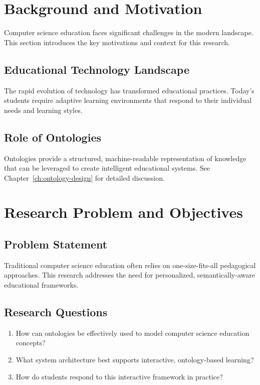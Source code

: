 \section{Background and Motivation}

Computer science education faces significant challenges in the modern landscape. This section introduces the key motivations and context for this research.

\subsection{Educational Technology Landscape}

The rapid evolution of technology has transformed educational practices. Today's students require adaptive learning environments that respond to their individual needs and learning styles.

\subsection{Role of Ontologies}

Ontologies provide a structured, machine-readable representation of knowledge that can be leveraged to create intelligent educational systems. See Chapter~\ref{ch:ontology-design} for detailed discussion.

\vspace{1em}

\section{Research Problem and Objectives}

\subsection{Problem Statement}

Traditional computer science education often relies on one-size-fits-all pedagogical approaches. This research addresses the need for personalized, semantically-aware educational frameworks.

\subsection{Research Questions}

\begin{enumerate}
    \item How can ontologies be effectively used to model computer science education concepts?
    \item What system architecture best supports interactive, ontology-based learning?
    \item How do students respond to this interactive framework in practice?
\end{enumerate}


